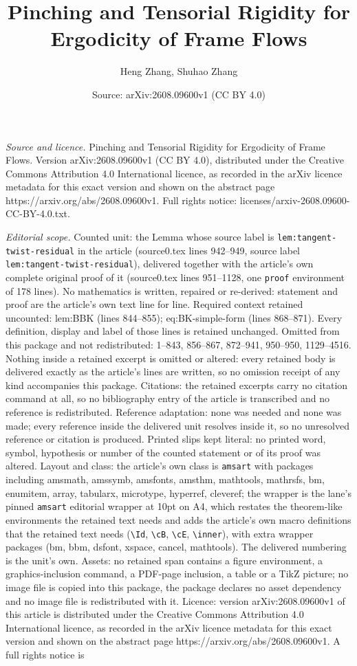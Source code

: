 \documentclass[10pt,a4paper]{amsart}
\title[Pinching and Tensorial Rigidity for Ergodicity of Frame Flow]{Pinching and Tensorial Rigidity for Ergodicity of Frame Flows}
\author{Heng Zhang, Shuhao Zhang}
\date{Source: arXiv:2608.09600v1 (CC BY 4.0)}
\begin{document}
\maketitle

\noindent\emph{Source and licence.} Pinching and Tensorial Rigidity for Ergodicity of Frame Flows. Version arXiv:2608.09600v1 (CC BY 4.0), distributed under the Creative Commons Attribution 4.0 International licence, as recorded in the arXiv licence metadata for this exact version and shown on the abstract page https://arxiv.org/abs/2608.09600v1. Full rights notice: licenses/arxiv-2608.09600-CC-BY-4.0.txt.\par\smallskip

\noindent\textit{Editorial scope.} Counted unit: the Lemma whose source label is \texttt{lem:tangent-twist-residual} in the article (source0.tex lines 942--949, source label \texttt{lem:tangent-twist-residual}), delivered together with the article's own complete original proof of it (source0.tex lines 951--1128, one \texttt{proof} environment of 178 lines). No mathematics is written, repaired or re-derived: statement and proof are the article's own text line for line. Required context retained uncounted: lem:BBK (lines 844--855); eq:BK-simple-form (lines 868--871). Every definition, display and label of those lines is retained unchanged. Omitted from this package and not redistributed: 1--843, 856--867, 872--941, 950--950, 1129--4516. Nothing inside a retained excerpt is omitted or altered: every retained body is delivered exactly as the article's lines are written, so no omission receipt of any kind accompanies this package. Citations: the retained excerpts carry no citation command at all, so no bibliography entry of the article is transcribed and no reference is redistributed. Reference adaptation: none was needed and none was made; every reference inside the delivered unit resolves inside it, so no unresolved reference or citation is produced. Printed slips kept literal: no printed word, symbol, hypothesis or number of the counted statement or of its proof was altered. Layout and class: the article's own class is \texttt{amsart} with packages including amsmath, amssymb, amsfonts, amsthm, mathtools, mathrsfs, bm, enumitem, array, tabularx, microtype, hyperref, cleveref; the wrapper is the lane's pinned \texttt{amsart} editorial wrapper at 10pt on A4, which restates the theorem-like environments the retained text needs and adds the article's own macro definitions that the retained text needs (\texttt{\textbackslash Id}, \texttt{\textbackslash cB}, \texttt{\textbackslash cE}, \texttt{\textbackslash inner}), with extra wrapper packages (bm, bbm, dsfont, xspace, cancel, mathtools). The delivered numbering is the unit's own. Assets: no retained span contains a figure environment, a graphics-inclusion command, a PDF-page inclusion, a table or a TikZ picture; no image file is copied into this package, the package declares no asset dependency and no image file is redistributed with it. Licence: version arXiv:2608.09600v1 of this article is distributed under the Creative Commons Attribution 4.0 International licence, as recorded in the arXiv licence metadata for this exact version and shown on the abstract page https://arxiv.org/abs/2608.09600v1. A full rights notice is 
\end{document}
